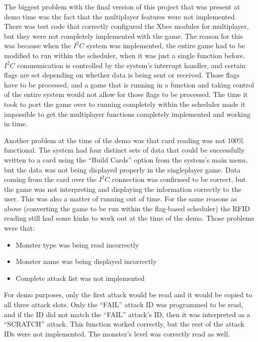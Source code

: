 \documentclass[12pt]{article} %
\begin{document}
\begin{itemize}
\begin{itemize}
\begin{itemize}
\begin{itemize}
The biggest problem with the final version of this project that was present at
demo time was the fact that the multiplayer features were not implemented.
There was test code that correctly configured the Xbee modules for multiplayer,
but they were not completely implemented with the game.  The reason for this
was because when the $I^2C$ system was implemented, the entire game had to be
modified to run within the scheduler, when it was just a single function
before.  $I^2C$ communication is controlled by the system's interrupt handler,
and certain flags are set depending on whether data is being sent or received.
Those flags have to be processed, and a game that is running in a function and
taking control of the entire system would not allow for those flags to be
processed.  The time it took to port the game over to running completely within
the scheduler made it impossible to get the multiplayer functions completely
implemented and working in time.

Another problem at the time of the demo was that card reading was not 100\%
functional.  The system had four distinct sets of data that could be
successfully written to a card using the ``Build Cards'' option from the
system's main menu, but the data was not being displayed properly in the
singleplayer game.  Data coming from the card over the $I^2C$ connection was
confirmed to be correct, but the game was not interpreting and displaying the
information correctly to the user.  This was also a matter of running out of
time.  For the same reasons as above (converting the game to be run within the
flag-based scheduler) the RFID reading still had some kinks to work out at the
time of the demo.  Those problems were that:

\begin{itemize}
	\item Monster type was being read incorrectly
	\item Monster name was being displayed incorrectly
	\item Complete attack list was not implemented
\end{itemize}

For demo purposes, only the first attack would be read and it would be copied
to all three attack slots.  Only the ``FAIL'' attack ID was programmed to be
read, and if the ID did not match the ``FAIL'' attack's ID, then it was
interpreted as a ``SCRATCH'' attack.  This function worked correctly, but the
rest of the attack IDs were not implemented.  The monster's level was correctly
read as well.


\end{itemize}
\end{itemize}
\end{itemize}
\end{itemize}
\end{document}
